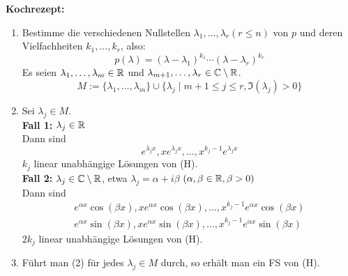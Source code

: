 \documentclass[a4paper,twoside,DIV15,BCOR12mm,chapterprefix=true,headings=twolinechapter]{scrbook}
\begin{document}
\textbf{Kochrezept:}
\begin{enumerate}
\item Bestimme die verschiedenen Nullstellen $\lambda_1,\ldots,\lambda_r (r\le n)$ von $p$
und deren Vielfachheiten $k_1,\ldots,k_r$, also:
\[p(\lambda)=(\lambda-\lambda_1)^{k_1}\cdots(\lambda-\lambda_r)^{k_r}\]
Es seien $\lambda_1,\ldots,\lambda_m\in\mathbb{R}$ und $\lambda_{m+1},\ldots,\lambda_r\in\mathbb{C}\setminus\mathbb{R}$.
\[M:=\{\lambda_1,\ldots,\lambda_m\}\cup\{\lambda_j\mid m+1\le j\le r,\Im(\lambda_j)>0\}\]
\item Sei $\lambda_j\in M$.\\
\textbf{Fall 1:} $\lambda_j\in\mathbb{R}$\\
Dann sind
\[e^{\lambda_jx},xe^{\lambda_jx},\ldots,x^{k_j-1}e^{\lambda_jx}\]
$k_j$ linear unabhängige Lösungen von (H).\\
\textbf{Fall 2:} $\lambda_j\in\mathbb{C}\setminus\mathbb{R}$, etwa $\lambda_j=\alpha+i\beta$ $(\alpha,\beta\in\mathbb{R},\beta>0)$\\
Dann sind
\begin{align*}
e^{\alpha x}\cos(\beta x), xe^{\alpha x}\cos(\beta x),\ldots,x^{k_j-1}e^{\alpha x}\cos(\beta x)\\
e^{\alpha x}\sin(\beta x), xe^{\alpha x}\sin(\beta x),\ldots,x^{k_j-1}e^{\alpha x}\sin(\beta x)
\end{align*}
$2k_j$ linear unabhängige Lösungen von (H).
\item Führt man (2) für jedes $\lambda_j\in M$ durch, so erhält man ein FS von (H).
\end{enumerate}
\end{document}
